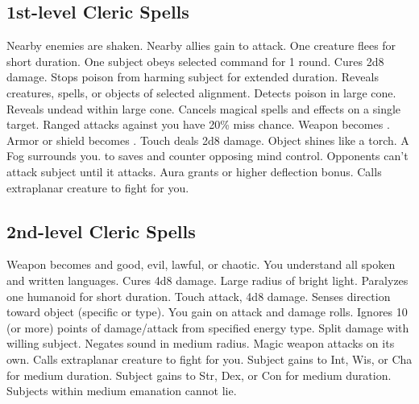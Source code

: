 \subsection{1st-level Cleric Spells}
\begin{spelllist}
   Nearby enemies are shaken.
   Nearby allies gain  to attack.
   One creature flees for short duration.
   One subject obeys selected command for 1 round.
   Cures 2d8 damage.
   Stops poison from harming subject for extended duration.
   Reveals creatures, spells, or objects of selected alignment.
   Detects poison in large cone.
   Reveals undead within large cone.
   Cancels magical spells and effects on a single target.
   Ranged attacks against you have 20\% miss chance.
   Weapon becomes .
   Armor or shield becomes .
   Touch deals 2d8 damage.
   Object shines like a torch.
   A Fog surrounds you.
    to saves and counter opposing mind control.
  Opponents can't attack subject until it attacks.
   Aura grants  or higher deflection bonus.
   Calls extraplanar creature to fight for you.
\end{spelllist}

\subsection{2nd-level Cleric Spells}
\begin{spelllist}
   Weapon becomes  and good, evil, lawful, or chaotic.
   You understand all spoken and written languages.
   Cures 4d8 damage.
   Large radius of bright light.
   Paralyzes one humanoid for short duration.
   Touch attack, 4d8 damage.
   Senses direction toward object (specific or type).
   You gain  on attack and damage rolls.
   Ignores 10 (or more) points of damage/attack from specified energy type.
    Split damage with willing subject.
   Negates sound in medium radius.
   Magic weapon attacks on its own.
   Calls extraplanar creature to fight for you.
   Subject gains  to Int, Wis, or Cha for medium duration.
   Subject gains  to Str, Dex, or Con for medium duration.
   Subjects within medium emanation cannot lie.
\end{spelllist}

